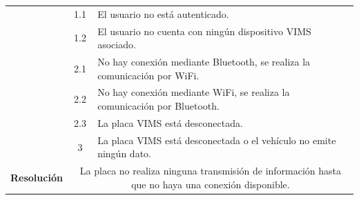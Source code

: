 \begin{table}[H]
\begin{tabularx}{\textwidth}{|c|c|X|}
                                               & 1.1                                                                                                                    & \multicolumn{1}{L|}{El usuario no está autenticado.}                                                                       \\
    \cline{2-3}
                                               & 1.2                                                                                                                    & \multicolumn{1}{L|}{El usuario no cuenta con ningún dispositivo \ac{VIMS} asociado.}                                       \\
    \cline{2-3}
                                               & 2.1                                                                                                                    & \multicolumn{1}{L|}{No hay conexión mediante Bluetooth, se realiza la comunicación por WiFi.}                              \\
    \cline{2-3}
                                               & 2.2                                                                                                                    & \multicolumn{1}{L|}{No hay conexión mediante WiFi, se realiza la comunicación por Bluetooth.}                              \\
    \cline{2-3}
                                               & 2.3                                                                                                                    & \multicolumn{1}{L|}{La placa \ac{VIMS} está desconectada.}                                                                 \\
    \cline{2-3}
                                               & 3                                                                                                                      & \multicolumn{1}{L|}{La placa \ac{VIMS} está desconectada o el vehículo no emite ningún dato.}                              \\
    \hline\hline
    \textbf{Resolución}                        & \multicolumn{2}{X|}{La placa no realiza ninguna transmisión de información hasta que no haya una conexión disponible.}                                                                                                                              \\
    \hline
  \end{tabularx}
\end{table}

